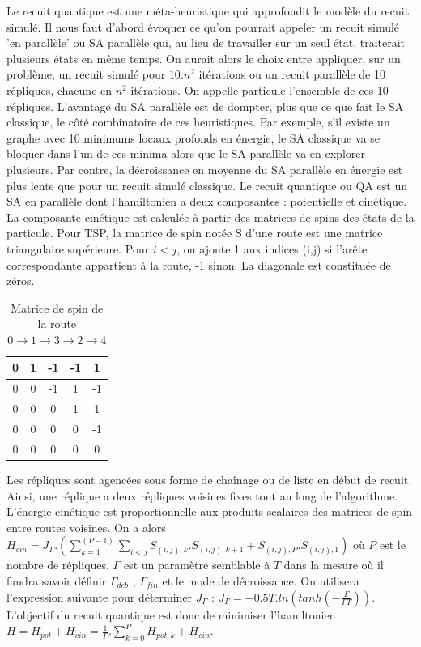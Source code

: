 \documentclass{article}%
\begin{document}
	Le recuit quantique est une méta-heuristique qui approfondit le modèle du recuit simulé. Il nous faut d'abord évoquer ce qu'on pourrait appeler un recuit simulé 'en parallèle' ou SA parallèle qui, au lieu de travailler sur un seul état, traiterait plusieurs états en même temps. On aurait alors le choix entre appliquer, sur un problème, un recuit simulé pour $ 10.n^2 $ itérations ou un recuit parallèle de 10 répliques, chacune en $ n^2 $ itérations. On appelle particule l'ensemble de ces 10 répliques. L'avantage du SA parallèle est de dompter, plus que ce que fait le SA classique, le côté combinatoire de ces heuristiques. Par exemple, s'il existe un graphe avec 10 minimums locaux profonds en énergie, le SA classique va se bloquer dans l'un de ces minima alors que le SA parallèle va en explorer plusieurs. Par contre, la décroissance en moyenne du SA parallèle en énergie est plus lente que pour un recuit simulé classique.
	Le recuit quantique ou QA est un SA en parallèle dont l'hamiltonien a deux composantes : potentielle et cinétique. La composante cinétique est calculée à partir des matrices de spins des états de la particule. Pour TSP, la matrice de spin notée S d'une route est une matrice triangulaire supérieure. Pour $ i < j $, on ajoute 1 aux indices (i,j) si l'arête correspondante appartient à la route, -1 sinon. La diagonale est constituée de zéros. 
	
	\begin{table}[hp]
		\centering
			\begin{tabular}{|*{5}{c|}}
					\hline
					0  & 1  & -1 & -1 & 1 \\
					\hline
					0  & 0 & -1 & 1 & -1 \\
					\hline
					0  & 0 & 0 & 1 & 1 \\
					\hline
					0  & 0 & 0 & 0 & -1 \\
					\hline
					0  & 0 & 0 & 0 & 0 \\
					\hline
			\end{tabular}
		\label{spin}
		\caption{Matrice de spin de la route $ 0 \rightarrow 1 \rightarrow 3 \rightarrow 2 \rightarrow 4 $}
	\end{table}
	
	Les répliques sont agencées sous forme de chaînage ou de liste en début de recuit. Ainsi, une réplique a deux répliques voisines fixes tout au long de l'algorithme. L'énergie cinétique est proportionnelle aux produits scalaires des matrices de spin entre routes voisines. On a alors $ H_{cin} = J_{\Gamma}.(\sum_{k=1}^(P-1) \sum_{i<j} S_{(i,j),k}.S_{(i,j),k+1} + S_{(i,j),P}.S_{(i,j),1})$ où $ P $ est le nombre de répliques. $ \Gamma $ est un paramètre semblable à $ T $ dans la mesure où il faudra savoir définir $ \Gamma_{deb} $ , $ \Gamma_{fin} $ et le mode de décroissance. On utilisera l'expression suivante pour déterminer $ J_{\Gamma} $ : $ J_{\Gamma} = -0.5T.ln(tanh(-\frac{\Gamma}{PT})) $. 
		L'objectif du recuit quantique est donc de minimiser l'hamiltonien $ H = H_{pot} + H_{cin} = \frac{1}{P}.\sum_{k=0}^P H_{pot,k} + H_{cin} $.
		
\end{document}
